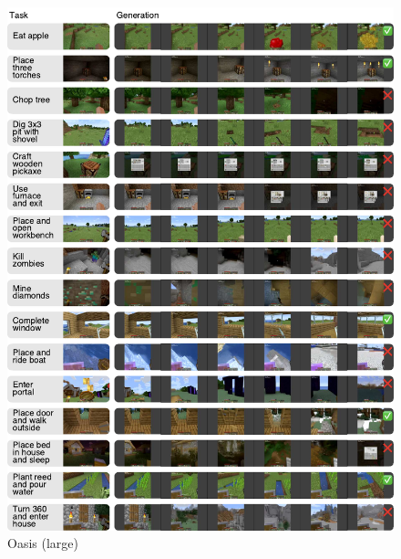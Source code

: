 \begin{figure}[h!]
\includegraphics[width=0.97\linewidth]{figures/wmtasks/oasis}
\caption{Oasis (large)}
\label{fig:wmtasks_oasis}
\end{figure}